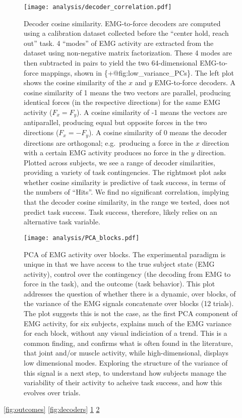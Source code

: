 \documentclass[../main.tex]{subfiles}
\begin{document}
\begin{figure}
\centering
\texttt{[image: analysis/decoder\_correlation.pdf]}
\caption{Decoder cosine similarity. EMG-to-force decoders are computed
using a calibration dataset collected before the ``center hold, reach
out'' task. 4 ``modes'' of EMG activity are extracted from the dataset
using non-negative matrix factorization. These 4 modes are then
subtracted in pairs to yield the two 64-dimensional EMG-to-force
mappings, shown in \{+@fig:low\_variance\_PCs\}. The left plot shows the
cosine similarity of the \(x\) and \(y\) EMG-to-force decoders. A cosine
similarity of 1 means the two vectors are parallel, producing identical
forces (in the respective directions) for the same EMG activity
(\(F_x = F_y\)). A cosine similarity of -1 means the vectors are
antiparallel, producing equal but opposite forces in the two directions
(\(F_x = -F_y\)). A cosine similarity of 0 means the decoder directions
are orthogonal; e.g.~producing a force in the \(x\) direction with a
certain EMG activity produces no force in the \(y\) direction. Plotted
across subjects, we see a range of decoder similarities, providing a
variety of task contingencies. The rightmost plot asks whether cosine
similarity is predictive of task success, in terms of the numbers of
``Hits''. We find no significant correlation, implying that the decoder
cosine similarity, in the range we tested, does not predict task
success. Task success, therefore, likely relies on an alternative task
variable.}\label{fig:decoder_correlations}
\end{figure}

\begin{figure}
\centering
\texttt{[image: analysis/PCA\_blocks.pdf]}
\caption{PCA of EMG activity over blocks. The experimental paradigm is
unique in that we have access to the true subject state (EMG activity),
control over the contingency (the decoding from EMG to force in the
task), and the outcome (task behavior). This plot addresses the question
of whether there is a dynamic, over blocks, of the variance of the EMG
signals concatenate over blocks (12 trials). The plot suggests this is
not the case, as the first PCA component of EMG activity, for six
subjects, explains much of the EMG variance for each block, without any
visual indiciation of a trend. This is a common finding, and confirms
what is often found in the literature, that joint and/or muscle
activity, while high-dimensional, displays low dimensional modes.
Exploring the structure of the variance of this signal is a next step,
to understand how subjects manage the variability of their activity to
acheive task success, and how this evolves over
trials.}\label{fig:behavior}
\end{figure}

\newpage

\cref{fig:outcomes}
\cref{fig:decoders}
\cref{fig:decoder_correlations}
\cref{fig:behavior}
\end{document}
